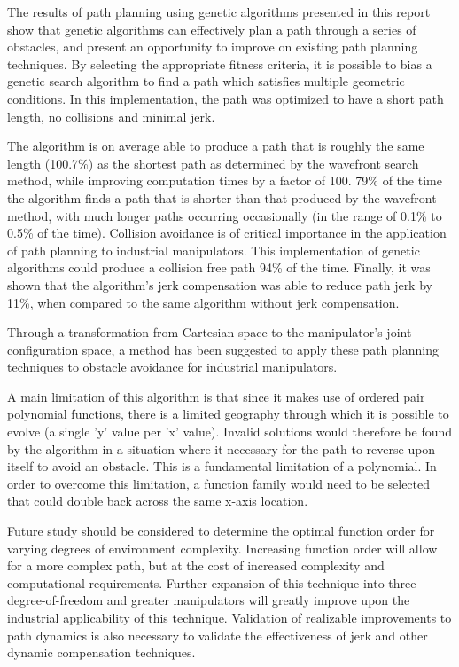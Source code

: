 The results of path planning using genetic algorithms presented in this report show that genetic algorithms can effectively plan a path through a series of obstacles, and present an opportunity to improve on existing path planning techniques. By selecting the appropriate fitness criteria, it is possible to bias a genetic search algorithm to find a path which satisfies multiple geometric conditions. In this implementation, the path was optimized to have a short path length, no collisions and minimal jerk.

The algorithm is on average able to produce a path that is roughly the same length (100.7\%) as the shortest path as determined by the wavefront search method, while improving computation times by a factor of 100. 79\% of the time the algorithm finds a path that is shorter than that produced by the wavefront method, with much longer paths occurring occasionally (in the range of 0.1\% to 0.5\% of the time). Collision avoidance is of critical importance in the application of path planning to industrial manipulators. This implementation of genetic algorithms could produce a collision free path 94\% of the time. Finally, it was shown that the algorithm's jerk compensation was able to reduce path jerk by 11\%, when compared to the same algorithm without jerk compensation.

Through a transformation from Cartesian space to the manipulator's joint configuration space, a method has been suggested to apply these path planning techniques to obstacle avoidance for industrial manipulators.

A main limitation of this algorithm is that since it makes use of ordered pair polynomial functions, there is a limited geography through which it is possible to evolve (a single 'y' value per 'x' value). Invalid solutions would therefore be found by the algorithm in a situation where it necessary for the path to reverse upon itself to avoid an obstacle. This is a fundamental limitation of a polynomial. In order to overcome this limitation, a function family would need to be selected that could double back across the same x-axis location.

Future study should be considered to determine the optimal function order for varying degrees of environment complexity. Increasing function order will allow for a more complex path, but at the cost of increased complexity and computational requirements. Further expansion of this technique into three degree-of-freedom and greater manipulators will greatly improve upon the industrial applicability of this technique. Validation of realizable improvements to path dynamics is also necessary to validate the effectiveness of jerk and other dynamic compensation techniques.